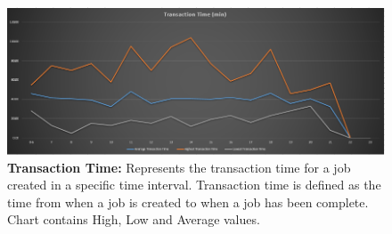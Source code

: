 \documentclass[paper=letter, fontsize=10pt]{scrartcl}
\numberwithin{equation}{section}		%
\numberwithin{figure}{section}			%
\numberwithin{table}{section}				%
\begin{document}
		\begin{figure}[!htbp]
		\begin{center}
			\includegraphics[width=1\columnwidth, height=0.3\textheight, keepaspectratio]{transactionTime.png}
			\caption{\textbf{Transaction Time:} Represents the transaction time for a job created in a specific time interval. Transaction time is defined as the time from when a job is created to when a job has been complete. Chart contains High, Low and Average values.}
		\vspace{-5em}
		\end{center}
		\end{figure}
		
\end{document}
